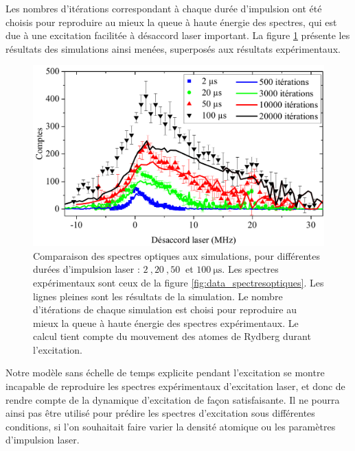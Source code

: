 Les nombres d'itérations correspondant à chaque durée d'impulsion ont été choisis pour reproduire au mieux la queue à haute énergie des spectres, qui est due à une excitation facilitée à désaccord laser important.
La figure \ref{fig:opt_spectra_firstTest} présente les résultats des simulations ainsi menées, superposés aux résultats expérimentaux.
%
\begin{figure}[!h]
\centering
\includegraphics[width=\linewidth]{figures/low_l/raies_laser_vieilles_simus}
\caption[Comparaison des spectres optiques au premier modèle de simulation]{
Comparaison des spectres optiques aux simulations, pour différentes durées d'impulsion laser : $\SI{2}{},\SI{20}{},\SI{50}{}$ et $\SI{100}{\us}$.
Les spectres expérimentaux sont ceux de la figure \ref{fig:data_spectresoptiques}.
Les lignes pleines sont les résultats de la simulation.
Le nombre d'itérations de chaque simulation est choisi pour reproduire au mieux la queue à haute énergie des spectres expérimentaux.
Le calcul tient compte du mouvement des atomes de Rydberg durant l'excitation.
}
\label{fig:opt_spectra_firstTest}
\end{figure}
%
Notre modèle sans échelle de temps explicite pendant l'excitation se montre incapable de reproduire les spectres expérimentaux d'excitation laser, et donc de rendre compte de la dynamique d'excitation de façon satisfaisante.
Il ne pourra ainsi pas être utilisé pour prédire les spectres d'excitation sous différentes conditions, si l'on souhaitait faire varier la densité atomique ou les paramètres d'impulsion laser.

